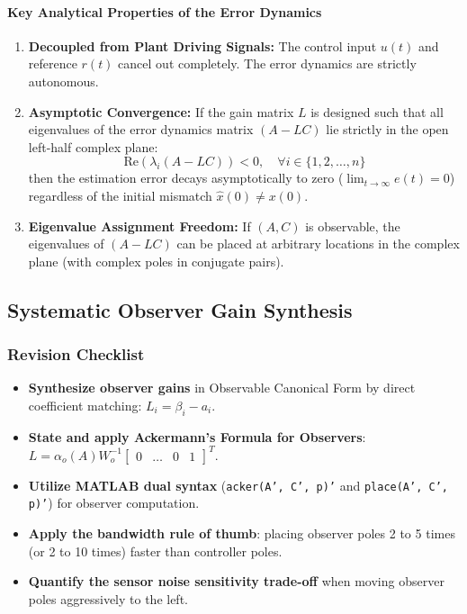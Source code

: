 \documentclass[12pt,onecolumn,twoside ]{article}
\begin{document}
	\paragraph{Key Analytical Properties of the Error Dynamics}
	\begin{enumerate}
		\item
		\textbf{Decoupled from Plant Driving Signals:} The control input $u(t)$ and reference $r(t)$ cancel out completely. The error dynamics are strictly autonomous.
		\item
		\textbf{Asymptotic Convergence:} If the gain matrix $L$ is designed such that all eigenvalues of the error dynamics matrix $(A - LC)$ lie strictly in the open left-half complex plane: \[
		\text{Re}(\lambda_i(A - LC)) < 0, \quad \forall i \in \{1, 2, \dots, n\}
		\] then the estimation error decays asymptotically to zero ($\lim_{t \to \infty} e(t) = 0$) regardless of the initial mismatch $\hat{x}(0) \neq x(0)$.
		\item
		\textbf{Eigenvalue Assignment Freedom:} If $(A, C)$ is observable, the eigenvalues of $(A - LC)$ can be placed at arbitrary locations in the complex plane (with complex poles in conjugate pairs).
	\end{enumerate}
	
	\subsection{Systematic Observer Gain Synthesis}
	\subsubsection{Revision Checklist}
	\begin{itemize}
		\item[$\square$]
		\textbf{Synthesize observer gains} in Observable Canonical Form by direct coefficient matching: $L_i = \beta_i - a_i$.
		\item[$\square$]
		\textbf{State and apply Ackermann’s Formula for Observers}: $L = \alpha_o(A) W_o^{-1} \begin{bmatrix} 0 & \dots & 0 & 1 \end{bmatrix}^T$.
		\item[$\square$]
		\textbf{Utilize MATLAB dual syntax} (\texttt{acker(A', C', p)'} and \texttt{place(A', C', p)'}) for observer computation.
		\item[$\square$]
		\textbf{Apply the bandwidth rule of thumb}: placing observer poles 2 to 5 times (or 2 to 10 times) faster than controller poles.
		\item[$\square$]
		\textbf{Quantify the sensor noise sensitivity trade-off} when moving observer poles aggressively to the left.
	\end{itemize}
	
\end{document}
